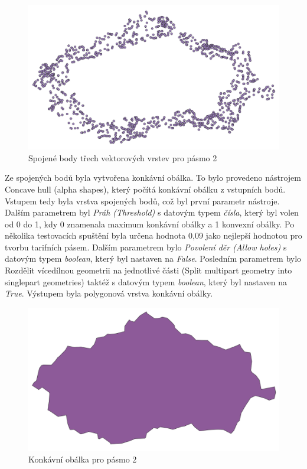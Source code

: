 \begin{figure}[H] \centering
    \includegraphics[width=400pt]{./pictures/merged.png}
    \caption[Spojené body třech vektorových vrstev pro pásmo 2]{Spojené body třech vektorových vrstev pro pásmo 2}
	\label{fig:merged}              
\end{figure} 

Ze spojených bodů byla vytvořena konkávní obálka. To bylo provedeno nástrojem Concave hull (alpha shapes),
který počítá konkávní obálku z vstupních bodů. Vstupem tedy byla vrstva spojených bodů, což byl první parametr
nástroje. Dalším parametrem byl \textit{Práh (Threshold)} s datovým typem \textit{čísla}, který byl volen od 0 do 1,
kdy 0 znamenala maximum konkávní obálky a 1 konvexní obálky. Po několika testovacích spuštění byla 
určena hodnota 0,09 jako nejlepší hodnotou pro tvorbu tarifních pásem. Dalším parametrem bylo \textit{Povolení děr (Allow holes)} 
s datovým typem \textit{boolean}, který byl nastaven na \textit{False}.
Posledním parametrem bylo Rozdělit vícedílnou geometrii na jednotlivé části (Split multipart geometry 
into singlepart geometries) taktéž s datovým typem \textit{boolean}, který byl nastaven na \textit{True}.  
Výstupem byla polygonová vrstva konkávní obálky. 

\begin{figure}[H] \centering
    \includegraphics[width=400pt]{./pictures/concaveHull.png}
    \caption[Konkávní obálka pro pásmo 2]{Konkávní obálka pro pásmo 2}
	\label{fig:concaveHull}              
\end{figure} 

